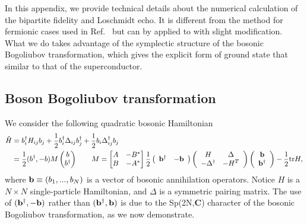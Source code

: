 
In this appendix, we provide technical details about the numerical calculation of the bipartite fidelity and Loschmidt echo. It is different from the method for fermionic cases used in Ref.~ but can by applied to with slight modification. What we do takes advantage of the symplectic structure of the bosonic Bogoliubov transformation, which gives the explicit form of ground state that similar to that of the superconductor. 

\subsection{Boson Bogoliubov transformation}
\label{app: Boson BdG}
We consider the following quadratic bosonic Hamiltonian
\begin{eqnarray}\begin{aligned}
\label{Quadratic boson H}
\hat{H}&=b_i^\dagger H_{ij}b_j+\frac{1}{2}b^\dagger_i\Delta_{ij}b_j^\dagger+\frac{1}{2}b_i\Delta^\dagger_{ij}b_j\\
&=
\frac{1}{2} (b^{\dagger}, -b)
M 
\begin{pmatrix}
b\\
b^{\dagger} 
\end{pmatrix} \qquad 
M = 
\begin{bmatrix}
A & -B^* \\
B & -A^* \\
\end{bmatrix}
\frac{1}{2}
\left(\begin{array}{ccc}
{\bf b}^\dagger & -{\bf b}
\end{array}\right)
\left(\begin{array}{ccc}
H & \Delta\\
-\Delta^\dagger & -H^T
\end{array}\right)
\left(\begin{array}{ccc}
{\bf b} \\
{\bf b}^\dagger
\end{array}\right)-\frac{1}{2}\text{tr}H,
\end{aligned}\end{eqnarray}
where ${\bf b}\equiv(b_{1},...,b_{N})$ is a vector of bosonic annihilation operators. Notice $H$ is a $N\times N$ single-particle Hamiltonian, and $\Delta$ is a symmetric pairing matrix. The use of $({\bf b}^\dagger , -{\bf b})$ rather than $({\bf b}^\dagger , {\bf b})$ is due to the Sp(2N,{\bf C}) character of the bosonic Bogoliubov transformation, as we now demonstrate. 

